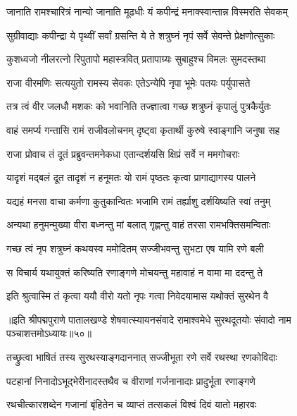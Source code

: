 \twolineshloka
{जानाति रामश्चारित्रं नान्यो जानाति मूढधीः}
{यं कपीन्द्रं मनाक्स्वान्तान्न विस्मरति सेवकम्}%

\twolineshloka
{सुग्रीवाद्याः कपीन्द्रा ये पृथ्वीं सर्वां ग्रसन्ति ये}
{ते शत्रुघ्नं नृपं सर्वे सेवन्ते प्रेक्षणोत्सुकाः}%

\twolineshloka
{कुशध्वजो नीलरत्नो रिपुतापो महास्त्रवित्}
{प्रतापाग्र्यः सुबाहुश्च विमलः सुमदस्तथा}%

\twolineshloka
{राजा वीरमणिः सत्ययुतो रामस्य सेवकः}
{एतेऽन्येपि नृपा भूमेः पतयः पर्युपासते}%

\twolineshloka
{तत्र त्वं वीर जलधौ मशकः को भवानिति}
{तज्ज्ञात्वा गच्छ शत्रुघ्नं कृपालुं पुत्रकैर्युतः}%

\twolineshloka
{वाहं समर्प्य गन्तासि रामं राजीवलोचनम्}
{दृष्ट्वा कृतार्थी कुरुषे स्वाङ्गानि जनुषा सह}%


\twolineshloka
{राजा प्रोवाच तं दूतं प्रब्रुवन्तमनेकधा}
{एतान्दर्शयसि क्षिप्रं सर्वे न ममगोचराः}%

\twolineshloka
{यादृशं मद्बलं दूत तादृशं न हनूमतः}
{यो रामं पृष्ठतः कृत्वा प्रागाद्यागस्य पालने}%

\twolineshloka
{यद्यहं मनसा वाचा कर्मणा कुतुकान्वितः}
{भजामि रामं तर्ह्याशु दर्शयिष्यति स्वां तनुम्}%

\twolineshloka
{अन्यथा हनुमन्मुख्या वीरा बध्नन्तु मां बलात्}
{गृह्णन्तु वाहं तरसा रामभक्तिसमन्विताः}%

\twolineshloka
{गच्छ त्वं नृप शत्रुघ्नं कथयस्व ममोदितम्}
{सज्जीभवन्तु सुभटा एष यामि रणे बली}%

\twolineshloka
{स विचार्य यथायुक्तं करिष्यति रणाङ्गणे}
{मोचयन्तु महावाहं न वामा मा ददन्तु ते}%


\twolineshloka
{इति श्रुत्वास्मि तं कृत्वा ययौ वीरो यतो नृपः}
{गत्वा निवेदयामास यथोक्तं सुरथेन वै}%

{॥इति श्रीपद्मपुराणे पातालखण्डे शेषवात्स्यायनसंवादे रामाश्वमेधे सुरथदूतयोः संवादो नाम पञ्चाशत्तमोऽध्यायः॥५०॥}



\twolineshloka
{तच्छ्रुत्वा भाषितं तस्य सुरथस्याङ्गदाननात्}
{सज्जीभूता रणे सर्वे रथस्था रणकोविदाः}%

\twolineshloka
{पटहानां निनादोऽभूद्भेरीनादस्तथैव च}
{वीराणां गर्जनानादाः प्रादुर्भूता रणाङ्गणे}%

\twolineshloka
{रथचीत्कारशब्देन गजानां बृंहितेन च}
{व्याप्तं तत्सकलं विश्वं दिवं यातो महारवः}%

